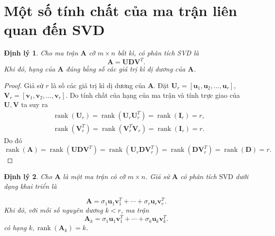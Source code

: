 \documentclass[12pt,a4paper,oneside]{report}
\newtheorem{dl}{Định lý}[section]
\numberwithin{equation}{section}
\begin{document}
\section{Một số tính chất của ma trận liên quan đến SVD}
\begin{dl} \cite{linh2016}
Cho ma trận $\mathbf{A}$ cỡ $m \times n$ bất kì, có phân tích SVD là
$$
\mathbf{A}=\mathbf{U D V}^{T}.
$$
Khi đó, hạng của $\mathbf{A}$ đúng bằng số các giá trị kì dị dương của $\mathbf{A}$.
\end{dl}
\begin{proof} 
Giả sử $r$ là số các giá trị kì dị dương của $\mathbf{A}$. Đặt $\mathbf{U}_{r}=\left[\mathbf{u}_{1}, \mathbf{u}_{2}, \ldots, \mathbf{u}_{r}\right]$, $\mathbf{V}_{r}=\left[\mathbf{v}_{1}, \mathbf{v}_{2}, \ldots, \mathbf{v}_{r}\right]$. Do tính chất của hạng của ma trận và tính trực giao của $\mathbf{U}, \mathbf{V}$ ta suy ra
$$
\begin{aligned}
	& \operatorname{rank}\left(\mathbf{U}_{r}\right)=\operatorname{rank}\left(\mathbf{U}_{r} \mathbf{U}_{r}^{T}\right)=\operatorname{rank}\left(\mathbf{I}_{r}\right)=r, \\
	& \operatorname{rank}\left(\mathbf{V}_{r}^{T}\right)=\operatorname{rank}\left(\mathbf{V}_{r}^{T} \mathbf{V}_{r}\right)=\operatorname{rank}\left(\mathbf{I}_{r}\right)=r .
\end{aligned}
$$
Do đó
$$
\operatorname{rank}(\mathbf{A})=\operatorname{rank}\left(\mathbf{U D V}^{T}\right)=\operatorname{rank}\left(\mathbf{U}_{r} \mathbf{D} \mathbf{V}_{r}^{T}\right)=\operatorname{rank}\left(\mathbf{D V}_{r}^{T}\right)=\operatorname{rank}(\mathbf{D})=r.$$
\end{proof}
\begin{dl} \cite{linh2016}
Cho $\mathbf{A}$ là một ma trận có cỡ $m \times n$. Giả sử $\mathbf{A}$ có phân tích $\mathrm{SVD}$ dưới dạng khai triển là

$$
\mathbf{A}=\sigma_{1} \mathbf{u}_{1} \mathbf{v}_{1}^{T}+\cdots+\sigma_{r} \mathbf{u}_{r} \mathbf{v}_{r}^{T}.
$$
Khi đó, với mỗi số nguyên dương $k<r$, ma trận
$$
\mathbf{A}_{k}=\sigma_{1} \mathbf{u}_{1} \mathbf{v}_{1}^{T}+\cdots+\sigma_{k} \mathbf{u}_{k} \mathbf{v}_{k}^{T}.
$$
có hạng $k, \operatorname{rank}\left(\mathbf{A}_{k}\right)=k$.
\end{dl}
\end{document}
